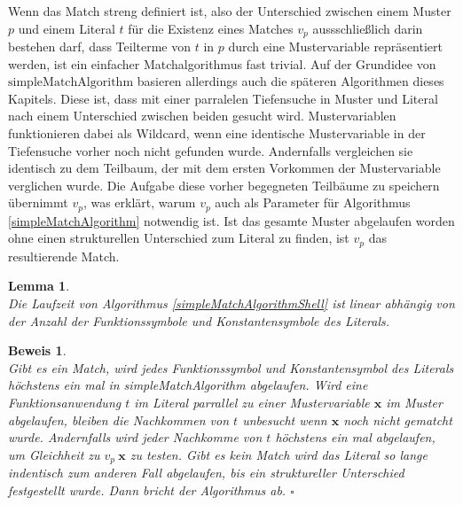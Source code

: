 Wenn das Match streng definiert ist, also der Unterschied zwischen einem Muster $p$ und einem Literal $t$ für die Existenz eines Matches $v_p$ aussschließlich darin bestehen darf, dass Teilterme von $t$ in $p$ durch eine Mustervariable repräsentiert werden, ist ein einfacher Matchalgorithmus fast trivial. Auf der Grundidee von $\mathrm{simpleMatchAlgorithm}$ basieren allerdings auch die späteren Algorithmen dieses Kapitels. Diese ist, dass mit einer parralelen Tiefensuche in Muster und Literal nach einem Unterschied zwischen beiden gesucht wird. Mustervariablen funktionieren dabei als Wildcard, wenn eine identische Mustervariable in der Tiefensuche vorher noch nicht gefunden wurde. Andernfalls vergleichen sie identisch zu dem Teilbaum, der mit dem ersten Vorkommen der Mustervariable verglichen wurde. Die Aufgabe diese vorher begegneten Teilbäume zu speichern übernimmt $v_p$, was erklärt, warum $v_p$ auch als Parameter für Algorithmus \ref{simpleMatchAlgorithm} notwendig ist. Ist das gesamte Muster abgelaufen worden ohne einen strukturellen Unterschied zum Literal zu finden, ist $v_p$ das resultierende Match.\\

\newtheorem{lemMatchLinear}[bsp]{Lemma}
\begin{lemMatchLinear}~\\
Die Laufzeit von Algorithmus \ref{simpleMatchAlgorithmShell} ist linear abhängig von der Anzahl der Funktionssymbole und Konstantensymbole des Literals.
\end{lemMatchLinear}

\newtheorem{bewNatchLinear}[bsp]{Beweis}
\begin{bewNatchLinear}~\\
Gibt es ein Match, wird jedes Funktionssymbol und Konstantensymbol des Literals höchstens ein mal in simpleMatchAlgorithm abgelaufen. Wird eine Funktionsanwendung $t$ im Literal parrallel zu einer Mustervariable $\mathbf x$ im Muster abgelaufen, bleiben die Nachkommen von $t$ unbesucht wenn $\mathbf x$ noch nicht gematcht wurde. Andernfalls wird jeder Nachkomme von $t$ höchstens ein mal abgelaufen, um Gleichheit zu $v_p~\mathbf x$ zu testen.
Gibt es kein Match wird das Literal so lange indentisch zum anderen Fall abgelaufen, bis ein struktureller Unterschied festgestellt wurde. Dann bricht der Algorithmus ab.
\hfill $\square$\\
\end{bewNatchLinear}




